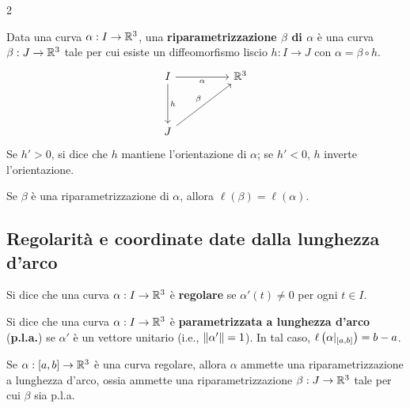 \begin{multicols*}{2}
    \begin{definition}
        Data una curva $\alpha : I \to \mathbb{R}^3$, una \textbf{riparametrizzazione $\beta$ di $\alpha$}
        è una curva $\beta : J \to \mathbb{R}^3$ tale per cui esiste un diffeomorfismo liscio
        $h : I \to J$ con $\alpha = \beta \circ h$.
        \[\begin{tikzcd}
                I && {\RR^3} \\
                \\
                J
                \arrow["\alpha"', from=1-1, to=1-3]
                \arrow["h", from=1-1, to=3-1]
                \arrow["\beta", from=3-1, to=1-3]
            \end{tikzcd}\]
        Se $h' > 0$, si dice che $h$ mantiene l'orientazione di $\alpha$; se $h' < 0$,
        $h$ inverte l'orientazione.
    \end{definition}

    \begin{proposition}
        Se $\beta$ è una riparametrizzazione di $\alpha$, allora $\ell(\beta) = \ell(\alpha)$.
    \end{proposition}

    \subsection{Regolarità e coordinate date dalla lunghezza d'arco}

    \begin{definition}
        Si dice che una curva $\alpha : I \to \mathbb{R}^3$ è \textbf{regolare} se
        $\alpha'(t) \neq 0$ per ogni $t \in I$.
    \end{definition}

    \begin{definition}
        Si dice che una curva $\alpha : I \to \mathbb{R}^3$ è \textbf{parametrizzata
            a lunghezza d'arco} (\textbf{p.l.a.}) se $\alpha'$ è un vettore
        unitario (i.e., $\left\lVert \alpha' \right\rVert = 1$).
        In tal caso, $\ell\left(\alpha\arrowvert_{[a, b]}\right) = b-a$.
    \end{definition}

    \begin{proposition}
        Se $\alpha : [a, b] \to \mathbb{R}^3$ è una curva regolare, allora $\alpha$
        ammette una riparametrizzazione a lunghezza d'arco, ossia ammette
        una riparametrizzazione $\beta : J \to \mathbb{R}^3$ tale per cui
        $\beta$ sia p.l.a.
    \end{proposition}


\end{multicols*}
